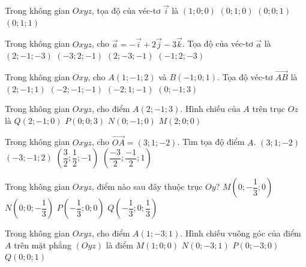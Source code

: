 \begin{ex}%
	Trong không gian $Oxyz$, tọa độ của véc-tơ $ \overrightarrow{i} $ là
	\choice
	{\True $ \left(1;0;0\right) $}
	{$ \left(0;1;0\right) $}
	{$ \left(0;0;1\right) $}
	{$ \left(0;1;1\right) $}
\end{ex}
\begin{ex}%
	Trong không gian $Oxyz$, cho $\overrightarrow{a}= -\overrightarrow{i}+ 2\overrightarrow{j}- 3\overrightarrow{k}$. Tọa độ của véc-tơ $\vec{a}$ là
	\choice
	{$(2;-1;-3)$}
	{$(-3;2;-1)$}
	{$(2;-3;-1)$}
	{\True $(-1;2;-3)$}
\end{ex}
\begin{ex}%
	Trong không gian $Oxy$, cho $A(1;-1;2)$ và $B(-1;0;1)$. Tọa độ véc-tơ $\overrightarrow{AB}$ là
	\choice
	{$ (2;-1;1) $}
	{$ (-2;-1;-1) $}
	{\True $ (-2;1;-1) $}
	{$ (0;-1;3) $}
\end{ex}
\begin{ex}%
	Trong không gian $Oxyz$, cho điểm $A(2;-1;3)$. Hình chiếu của $A$ trên trục $Oz$ là
	\choice
	{$Q(2;-1;0)$}
	{\True $P(0;0;3)$}
	{$N(0;-1;0)$}
	{$M(2;0;0)$}
\end{ex}
\begin{ex}%
	Trong không gian $Oxyz$, cho $\overrightarrow{OA}=(3;1;-2)$. Tìm tọa độ điểm $A$.
	\choice
	{\True$\left(3;1;-2\right)$}
	{$\left(-3;-1;2\right)$}
	{$\left(\dfrac{3}{2};\dfrac{1}{2};-1\right)$}
	{$\left(\dfrac{-3}{2};\dfrac{-1}{2};1\right)$}
\end{ex}
\begin{ex}%
	Trong không gian $ Oxyz $, điểm nào sau đây thuộc trục $ Oy $?
	\choice
	{\True $ M\left(0;-\dfrac{1}{3};0\right) $}
	{$ N\left(0;0;-\dfrac{1}{3}\right) $}
	{$ P\left(-\dfrac{1}{3};0;0\right) $}
	{$ Q\left(-\dfrac{1}{3};0;\dfrac{1}{3}\right) $}
\end{ex}
\begin{ex}%
	Trong không gian $Oxyz$, cho điểm $A\left(1;-3;1\right)$. Hình chiếu vuông góc của điểm $A$ trên mặt phẳng $\left(Oyz\right)$ là điểm
	\choice
	{$M\left(1;0;0\right)$}
	{\True $N\left(0;-3;1\right)$}
	{$P\left(0;-3;0\right)$}
	{$Q\left(0;0;1\right)$}
	
\end{ex}
